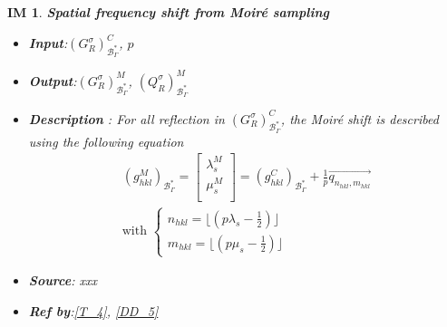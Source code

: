 \documentclass[12pt]{article}
\newtheorem{IM}{IM}
\begin{document}
\begin{IM}
\label{IM_3}
\noindent\colorbox{shadecolorIM}{\normalfont \textbf{Spatial frequency shift from Moir{\'e} sampling}}
\normalfont
\begin{itemize}
\item \textbf{Input}:$(G^{\sigma}_{R})^{C}_{\mathcal{B}_{\Gamma}^{*}}$, $p$
\item \textbf{Output}:$(G^{\sigma}_{R})^{M}_{\mathcal{B}_{\Gamma}^{*}}$, $(Q^{\sigma}_{R})^{M}_{\mathcal{B}_{\Gamma}^{*}}$
\item \textbf{Description} : For all reflection in $(G^{\sigma}_{R})^{C}_{\mathcal{B}_{\Gamma}^{*}}$, the Moir{\'e} shift is described using the following equation
\begin{equation*}
\begin{gathered}
(g_{hkl}^{M})_{\mathcal{B}_{\Gamma}^{*}} = 
\begin{bmatrix}
\lambda_{s}^{M} \\
\mu_{s}^{M} \\ 
\end{bmatrix} =
 (g_{hkl}^{C})_{\mathcal{B}_{\Gamma}^{*}}  +\frac{1}{p} \overrightarrow{q_{n_{hkl},m_{hkl}}}  \\
\text{with }\begin{cases}
n_{hkl} = \lfloor (p\lambda_s - \frac{1}{2}) \rfloor \\
m_{hkl} = \lfloor (p\mu_s - \frac{1}{2}) \rfloor 
\end{cases}
\end{gathered}
\end{equation*}
\item \textbf{Source}: xxx
\item \textbf{Ref by}:\cref{T_4}, \cref{DD_5}
\end{itemize}
\end{IM}
\end{document}
